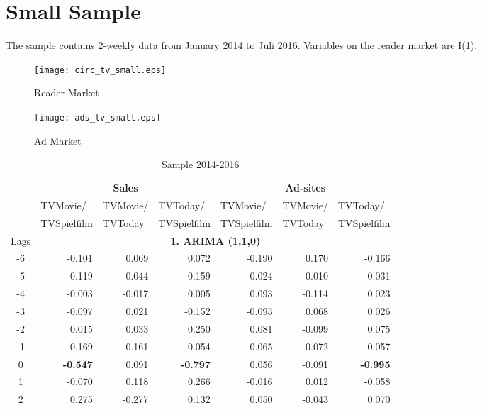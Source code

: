 \documentclass[10pt,a4paper]{scrreprt}
\begin{document}
\section{Small Sample}
The sample contains 2-weekly data from January 2014 to Juli 2016. Variables on the reader market are I(1). 

\begin{figure}[H]
	\centering
	\texttt{[image: circ\_tv\_small.eps]}
	\caption{Reader Market}
	\label{tvcirc}
\end{figure}
\begin{figure}[H]
	\centering
	\texttt{[image: ads\_tv\_small.eps]}
	\caption{Ad Market}
	\label{tvads}
\end{figure}

\begin{table}[htbp]
  \centering
  \caption{Sample 2014-2016}
    \begin{tabular}{c|rrr|rrr|}
	 & \multicolumn{3}{c|}{\textbf{Sales}} & \multicolumn{3}{c|}{\textbf{Ad-sites}} \\
          & \multicolumn{1}{l}{TVMovie/} & \multicolumn{1}{l}{TVMovie/} & \multicolumn{1}{l|}{TVToday/} & \multicolumn{1}{l}{TVMovie/} & \multicolumn{1}{l}{TVMovie/} & \multicolumn{1}{l|}{TVToday/} \\
          & \multicolumn{1}{l}{TVSpielfilm} & \multicolumn{1}{l}{TVToday} & \multicolumn{1}{l|}{TVSpielfilm} & \multicolumn{1}{l}{TVSpielfilm} & \multicolumn{1}{l}{TVToday} & \multicolumn{1}{l|}{TVSpielfilm} \\
\multicolumn{1}{c}{Lags} & \multicolumn{6}{c}{\textbf{1. ARIMA (1,1,0)}} \\
	-6    & -0.101 & 0.069 & 0.072 & -0.190 & 0.170 & -0.166 \\
    -5    & 0.119 & -0.044 & -0.159 & -0.024 & -0.010 & 0.031 \\
    -4    & -0.003 & -0.017 & 0.005 & 0.093 & -0.114 & 0.023 \\
    -3    & -0.097 & 0.021 & -0.152 & -0.093 & 0.068 & 0.026 \\
    -2    & 0.015 & 0.033 & 0.250 & 0.081 & -0.099 & 0.075 \\
    -1    & 0.169 & -0.161 & 0.054 & -0.065 & 0.072 & -0.057 \\
    0     & \textbf{-0.547} & 0.091 & \textbf{-0.797} & 0.056 & -0.091 & \textbf{-0.995} \\
    1     & -0.070 & 0.118 & 0.266 & -0.016 & 0.012 & -0.058 \\
    2     & 0.275 & -0.277 & 0.132 & 0.050 & -0.043 & 0.070 \\

\end{tabular}
\end{table}
\end{document}
